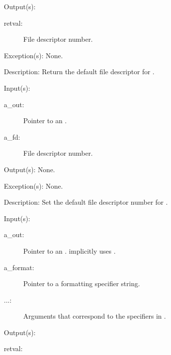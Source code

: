 \begin{capi}
\begin{capilist}
	\item[Output(s): ]
		\begin{description}\item[]
		\item[retval: ]
			File descriptor number.
		\end{description}
	\item[Exception(s): ] None.
	\item[Description: ]
		Return the default file descriptor for .
	\end{capilist}
\label{out_default_fd_set}
	\begin{capilist}
	\item[Input(s): ]
		\begin{description}\item[]
		\item[a\_out: ]
			Pointer to an .
		\item[a\_fd: ]
			File descriptor number.
		\end{description}
	\item[Output(s): ] None.
	\item[Exception(s): ] None.
	\item[Description: ]
		Set the default file descriptor number for .
	\end{capilist}
\label{out_put}
\label{_cw_out_put}
	\begin{capilist}
	\item[Input(s): ]
		\begin{description}\item[]
		\item[a\_out: ]
			Pointer to an \classname{out}.
			 implicitly uses
			\cvar{out\_std}.
		\item[a\_format: ]
			Pointer to a formatting specifier string.
		\item[...: ]
			Arguments that correspond to the specifiers in
			\cvar{a\_format}.
		\end{description}
	\item[Output(s): ]
		\begin{description}\item[]
		\item[retval: ]

\end{description}
\end{capilist}
\end{capi}
